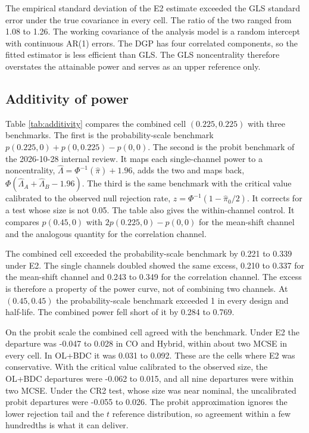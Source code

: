 \documentclass[
  11pt,
]{article}
\begin{document}
The empirical standard deviation of the E2 estimate exceeded the GLS
standard error under the true covariance in every cell. The ratio of
the two ranged from 1.08 to 1.26.
The working covariance of
the analysis model is a random intercept with continuous AR(1)
errors. The DGP has four correlated components, so the fitted
estimator is less efficient than GLS. The GLS noncentrality therefore
overstates the attainable power and serves as an upper reference only.

\subsection{Additivity of power}\label{sec-additivity}

Table \ref{tab:additivity} compares the combined cell
\((0.225, 0.225)\) with three benchmarks. The first is the
probability-scale benchmark \(p(0.225, 0) + p(0, 0.225) - p(0, 0)\).
The second is the probit benchmark of the 2026-10-28 internal review.
It maps each single-channel power to a noncentrality,
\(\hat\Lambda = \Phi^{-1}(\hat\pi) + 1.96\), adds the two and maps back,
\(\Phi(\hat\Lambda_A + \hat\Lambda_B - 1.96)\). The third is the same
benchmark with the critical value calibrated to the observed null
rejection rate, \(z = \Phi^{-1}(1 - \hat\pi_0/2)\). It corrects for a
test whose size is not 0.05. The table also gives the within-channel
control. It compares \(p(0.45, 0)\) with \(2p(0.225, 0) - p(0, 0)\) for
the mean-shift channel and the analogous quantity for the correlation
channel.

The combined cell exceeded the probability-scale benchmark by
0.221 to 0.339 under E2. The single channels
doubled showed the same excess, 0.210 to 0.337 for the mean-shift
channel and 0.243 to 0.349 for the correlation channel. The
excess is therefore a property of the power curve, not of combining
two channels. At \((0.45, 0.45)\) the probability-scale benchmark
exceeded 1 in every design and half-life. The combined power fell
short of it by 0.284 to 0.769.

On the probit scale the combined cell agreed with the benchmark. Under
E2 the departure was -0.047 to 0.028
in CO and Hybrid, within about two MCSE in every cell. In OL+BDC it was
0.031 to 0.092. These are the cells
where E2 was conservative. With the critical value calibrated to the
observed size, the OL+BDC departures were
-0.062 to 0.015, and all nine
departures were within two MCSE. Under the CR2 test, whose size was
near nominal, the uncalibrated probit departures were
-0.055 to 0.026.
The probit approximation ignores the lower rejection tail and the \(t\)
reference distribution, so agreement within a few hundredths is what
it can deliver.
\end{document}
